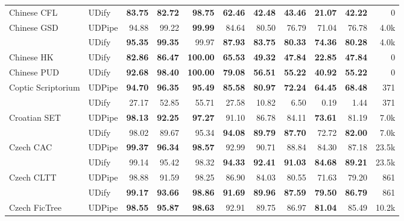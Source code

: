 \documentclass[11pt,a4paper]{article}
\begin{document}
\begin{table*}
\begin{center}
\begin{tabular}{@{}llrrrrrrrrr@{}}
    \addlinespace
    Chinese CFL & UDify &  \bf 83.75 &  \bf 82.72 &   \bf 98.75 &  \bf 62.46 &  \bf 42.48 &  \bf 43.46 &  \bf 21.07 &  \bf 42.22 &      0 \\
    \addlinespace
    Chinese GSD & UDPipe &      94.88 &      99.22 &   \bf 99.99 &      84.64 &      80.50 &      76.79 &      71.04 &      76.78 &   4.0k \\
               & UDify &  \bf 95.35 &  \bf 99.35 &       99.97 &  \bf 87.93 &  \bf 83.75 &  \bf 80.33 &  \bf 74.36 &  \bf 80.28 &   4.0k \\
    \addlinespace
    Chinese HK & UDify &  \bf 82.86 &  \bf 86.47 &  \bf 100.00 &  \bf 65.53 &  \bf 49.32 &  \bf 47.84 &  \bf 22.85 &  \bf 47.84 &      0 \\
    \addlinespace
    Chinese PUD & UDify &  \bf 92.68 &  \bf 98.40 &  \bf 100.00 &  \bf 79.08 &  \bf 56.51 &  \bf 55.22 &  \bf 40.92 &  \bf 55.22 &      0 \\
    \addlinespace
    Coptic Scriptorium & UDPipe &  \bf 94.70 &  \bf 96.35 &   \bf 95.49 &  \bf 85.58 &  \bf 80.97 &  \bf 72.24 &  \bf 64.45 &  \bf 68.48 &    371 \\
               & UDify &      27.17 &      52.85 &       55.71 &      27.58 &      10.82 &       6.50 &       0.19 &       1.44 &    371 \\
    \addlinespace
    Croatian SET & UDPipe &  \bf 98.13 &  \bf 92.25 &   \bf 97.27 &      91.10 &      86.78 &      84.11 &  \bf 73.61 &      81.19 &   7.0k \\
               & UDify &      98.02 &      89.67 &       95.34 &  \bf 94.08 &  \bf 89.79 &  \bf 87.70 &      72.72 &  \bf 82.00 &   7.0k \\
    \addlinespace
    Czech CAC & UDPipe &  \bf 99.37 &  \bf 96.34 &   \bf 98.57 &      92.99 &      90.71 &      88.84 &      84.30 &      87.18 &  23.5k \\
               & UDify &      99.14 &      95.42 &       98.32 &  \bf 94.33 &  \bf 92.41 &  \bf 91.03 &  \bf 84.68 &  \bf 89.21 &  23.5k \\
    \addlinespace
    Czech CLTT & UDPipe &      98.88 &      91.59 &       98.25 &      86.90 &      84.03 &      80.55 &      71.63 &      79.20 &    861 \\
               & UDify &  \bf 99.17 &  \bf 93.66 &   \bf 98.86 &  \bf 91.69 &  \bf 89.96 &  \bf 87.59 &  \bf 79.50 &  \bf 86.79 &    861 \\
    \addlinespace
    Czech FicTree & UDPipe &  \bf 98.55 &  \bf 95.87 &   \bf 98.63 &      92.91 &      89.75 &      86.97 &  \bf 81.04 &      85.49 &  10.2k \\

\end{tabular}
\end{center}
\end{table*}
\end{document}

